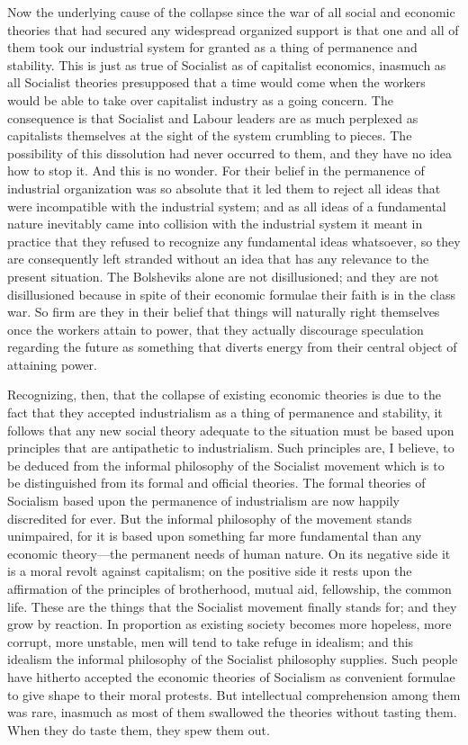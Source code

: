 \documentclass{book}
\begin{document}
Now the underlying cause of the collapse since the war of all social and economic theories that had secured any widespread organized support is that one and all of them took our industrial system for granted as a thing of permanence and stability. This is just as true of Socialist as of capitalist economics, inasmuch as all Socialist theories presupposed that a time would come when the workers would be able to take over capitalist industry as a going concern. The consequence is that Socialist and Labour leaders are as much perplexed as capitalists themselves at the sight of the system crumbling to pieces. The possibility of this dissolution had never occurred to them, and they have no idea how to stop it. And this is no wonder. For their belief in the permanence of industrial organization was so absolute that it led them to reject all ideas that were incompatible with the industrial system; and as all ideas of a fundamental nature inevitably came into collision with the industrial system it meant in practice that they refused to recognize any fundamental ideas whatsoever, so they are consequently left stranded without an idea that has any relevance to the present situation. The Bolsheviks alone are not disillusioned; and they are not disillusioned because in spite of their economic formulae their faith is in the class war. So firm are they in their belief that things will naturally right themselves once the workers attain to power, that they actually discourage speculation regarding the future as something that diverts energy from their central object of attaining power.

Recognizing, then, that the collapse of existing economic theories is due to the fact that they accepted industrialism as a thing of permanence and stability, it follows that any new social theory adequate to the situation must be based upon principles that are antipathetic to industrialism. Such principles are, I believe, to be deduced from the informal philosophy of the Socialist movement which is to be distinguished from its formal and official theories. The formal theories of Socialism based upon the permanence of industrialism are now happily discredited for ever. But the informal philosophy of the movement stands unimpaired, for it is based upon something far more fundamental than any economic theory—the permanent needs of human nature. On its negative side it is a moral revolt against capitalism; on the positive side it rests upon the affirmation of the principles of brotherhood, mutual aid, fellowship, the common life. These are the things that the Socialist movement finally stands for; and they grow by reaction. In proportion as existing society becomes more hopeless, more corrupt, more unstable, men will tend to take refuge in idealism; and this idealism the informal philosophy of the Socialist philosophy supplies. Such people have hitherto accepted the economic theories of Socialism as convenient formulae to give shape to their moral protests. But intellectual comprehension among them was rare, inasmuch as most of them swallowed the theories without tasting them. When they do taste them, they spew them out.
\end{document}
